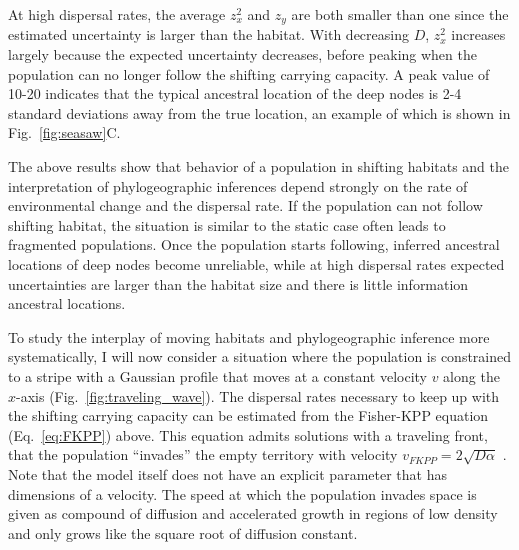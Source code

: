 \documentclass[aps,rmp, twocolumn]{revtex4}
\begin{document}
At high dispersal rates, the average $z_x^2$ and $z_y$ are both smaller than one since the estimated uncertainty is larger than the habitat.
With decreasing $D$, $z_x^2$ increases largely because the expected uncertainty decreases, before peaking when the population can no longer follow the shifting carrying capacity.
A peak value of 10-20 indicates that the typical ancestral location of the deep nodes is 2-4 standard deviations away from the true location, an example of which is shown in Fig.~\ref{fig:seasaw}C.


The above results show that behavior of a population in shifting habitats and the interpretation of phylogeographic inferences depend strongly on the rate of environmental change and the dispersal rate.
If the population can not follow shifting habitat, the situation is similar to the static case often leads to fragmented populations.
Once the population starts following, inferred ancestral locations of deep nodes become unreliable, while at high dispersal rates expected uncertainties are larger than the habitat size and there is little information ancestral locations.

To study the interplay of moving habitats and phylogeographic inference more systematically, I will now consider a situation where the population is constrained to a stripe with a Gaussian profile that moves at a constant velocity $v$ along the $x$-axis (Fig.~\ref{fig:traveling_wave}).
The dispersal rates necessary to keep up with the shifting carrying capacity can be estimated from the Fisher-KPP equation (Eq.~\ref{eq:FKPP}) above.
This equation admits solutions with a traveling front, that the population ``invades'' the empty territory with velocity $v_{FKPP} = 2\sqrt{D \alpha}$ \citep{fisher_wave_1937,KPP1937,hallatschek_life_2010}.
Note that the model itself does not have an explicit parameter that has dimensions of a velocity.
The speed at which the population invades space is given as compound of diffusion and accelerated growth in regions of low density and only grows like the square root of diffusion constant.
\end{document}
